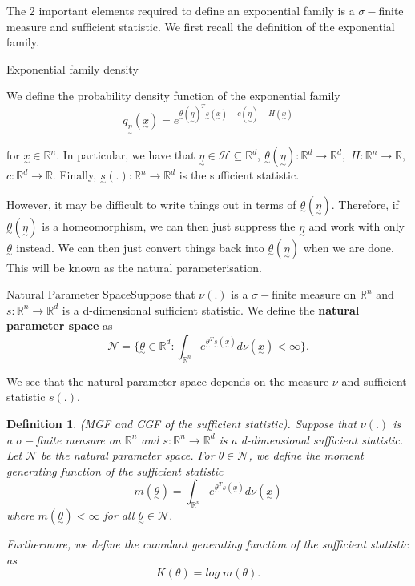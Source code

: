 \documentclass[twoside]{article}
\newtheorem{definition}[theorem]{Definition}
\newcommand{\utilde}{\underset{\sim}}
\begin{document}
The 2 important elements required to define an exponential family is a $\sigma-$finite measure and sufficient statistic. We first recall the definition of the exponential family.


\begin{definition_exam}{Exponential family density}{}

We define the probability density function of the exponential family 
$$
q_{\utilde{\eta}}(\utilde{x}) = e^{\utilde{\theta}(\utilde{\eta})^T\utilde{s}(\utilde{x}) - c(\utilde{\eta}) - H(\utilde{x})}
$$

for $\utilde{x} \in \mathbb{R}^n.$ In particular, we have that $\utilde{\eta} \in \mathcal{H} \subseteq \mathbb{R}^d$, $\utilde{\theta}(\utilde{\eta}): \mathbb{R}^d \rightarrow \mathbb{R}^d,$ $H: \mathbb{R}^n \rightarrow \mathbb{R},$ $c: \mathbb{R}^d \rightarrow \mathbb{R}$. Finally, $\utilde{s}(.): \mathbb{R}^n \rightarrow \mathbb{R}^d$ is the sufficient statistic.
\end{definition_exam}

However, it may be difficult to write things out in terms of $\utilde{\theta}(\utilde{\eta})$. Therefore, if $\utilde{\theta}(\utilde{\eta})$ is a homeomorphism, we can then just suppress the $\utilde{\eta}$ and work with only $\utilde{\theta}$ instead. We can then just convert things back into $\utilde{\theta}(\utilde{\eta})$ when we are done. This will be known as the natural parameterisation.

\begin{definition_exam}{Natural Parameter Space}{}Suppose that $\nu(.)$ is a $\sigma-$finite measure on $\mathbb{R}^n$ and $s: \mathbb{R}^n \rightarrow \mathbb{R}^d$ is a d-dimensional sufficient statistic. We define the \textbf{natural parameter space} as 
$$
\mathcal{N} = \{\utilde{\theta} \in \mathbb{R}^d: \int_{\mathbb{R}^n}e^{\utilde{\theta}^T \utilde{s}(\utilde{x})}d\nu(\utilde{x}) < \infty\}.
$$
\end{definition_exam}

We see that the natural parameter space depends on the measure $\nu$ and sufficient statistic $s(.).$


\begin{definition}(MGF and CGF of the sufficient statistic). Suppose that $\nu(.)$ is a $\sigma-$finite measure on $\mathbb{R}^n$ and $s: \mathbb{R}^n \rightarrow \mathbb{R}^d$ is a d-dimensional sufficient statistic. Let $\mathcal{N}$ be the natural parameter space. For $\theta \in \mathcal{N}$, we define the moment generating function of the sufficient statistic
$$
m(\utilde{\theta}) = \int_{\mathbb{R}^n}e^{\utilde{\theta}^Ts(\utilde{x})}d\nu (\utilde{x})
$$
where $m(\utilde{\theta}) < \infty$ for all $\utilde{\theta} \in \mathcal{N}.$

Furthermore, we define the cumulant generating function of the sufficient statistic as 
$$
K(\theta) = log \;m(\theta).
$$
\end{definition}
\end{document}
